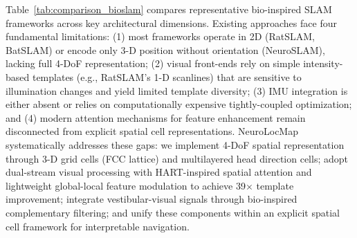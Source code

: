 Table~\ref{tab:comparison_bioslam} compares representative bio-inspired SLAM frameworks across key architectural dimensions. Existing approaches face four fundamental limitations: (1) most frameworks operate in 2D (RatSLAM, BatSLAM) or encode only 3-D position without orientation (NeuroSLAM), lacking full 4-DoF representation; (2) visual front-ends rely on simple intensity-based templates (e.g., RatSLAM's 1-D scanlines) that are sensitive to illumination changes and yield limited template diversity; (3) IMU integration is either absent or relies on computationally expensive tightly-coupled optimization; and (4) modern attention mechanisms for feature enhancement remain disconnected from explicit spatial cell representations. NeuroLocMap systematically addresses these gaps: we implement 4-DoF spatial representation through 3-D grid cells (FCC lattice) and multilayered head direction cells; adopt dual-stream visual processing with HART-inspired spatial attention and lightweight global-local feature modulation to achieve 39$\times$ template improvement; integrate vestibular-visual signals through bio-inspired complementary filtering; and unify these components within an explicit spatial cell framework for interpretable navigation.

